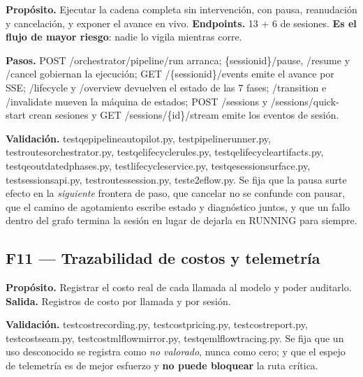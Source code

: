 \documentclass[11pt,a4paper]{article}
\newcommand{\code}[1]{{\ttfamily\small\def\_{\textunderscore\allowbreak}#1}}
\begin{document}
\begin{finding}
\textbf{Propósito.} Ejecutar la cadena completa sin intervención, con pausa, reanudación y
cancelación, y exponer el avance en vivo. \textbf{Endpoints.} 13 + 6 de sesiones.
\textbf{Es el flujo de mayor riesgo}: nadie lo vigila mientras corre.
\end{finding}

\noindent\textbf{Pasos.} \code{POST /orchestrator/pipeline/run} arranca;\newline
\code{\{session\_id\}/pause}, \code{/resume} y \code{/cancel} gobiernan la ejecución;
\code{GET /\{session\_id\}/events} emite el avance por SSE; \code{/lifecycle} y
\code{/overview} devuelven el estado de las 7 fases; \code{/transition} e \code{/invalidate}
mueven la máquina de estados; \code{POST /sessions} y \code{/sessions/quick-start} crean
sesiones y \code{GET /sessions/\{id\}/stream} emite los eventos de sesión.

\noindent\textbf{Validación.} \code{test\_qe\_pipeline\_autopilot.py},
\code{test\_pipeline\_runner.py}, \code{test\_routes\_orchestrator.py},
\code{test\_qe\_lifecycle\_rules.py}, \code{test\_qe\_lifecycle\_artifacts.py},
\code{test\_qe\_outdated\_phases.py}, \code{test\_lifecycle\_service.py},
\code{test\_qe\_session\_surface.py}, \code{test\_sessions\_api.py},
\code{test\_routes\_session.py}, \code{test\_e2e\_flow.py}. Se fija que la pausa surte efecto
en la \emph{siguiente} frontera de paso, que cancelar no se confunde con pausar, que el camino
de agotamiento escribe estado y diagnóstico juntos, y que un fallo dentro del grafo termina la
sesión en lugar de dejarla en \code{RUNNING} para siempre.

\subsection{F11 --- Trazabilidad de costos y telemetría}

\begin{finding}
\textbf{Propósito.} Registrar el costo real de cada llamada al modelo y poder auditarlo.
\textbf{Salida.} Registros de costo por llamada y por sesión.
\end{finding}

\noindent\textbf{Validación.} \code{test\_cost\_recording.py}, \code{test\_cost\_pricing.py},
\code{test\_cost\_report.py}, \code{test\_cost\_seam.py}, \code{test\_cost\_mlflow\_mirror.py},
\code{test\_qe\_mlflow\_tracing.py}. Se fija que un uso desconocido se registra como
\emph{no valorado}, nunca como cero; y que el espejo de telemetría es de mejor esfuerzo y
\textbf{no puede bloquear} la ruta crítica.
\end{document}
